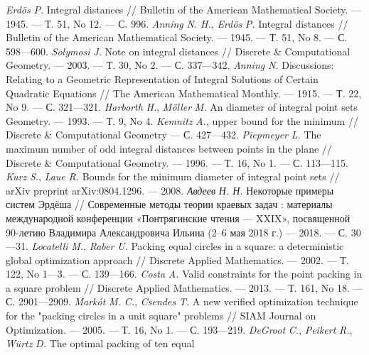 \begin{thebibliography}{99}
\textsl{Erdös} \textsl{P.} Integral distances /\!/ Bulletin of the
American Mathematical Society. — 1945. — Т. 51, No 12. — С. 996.
\textsl{Anning} \textsl{N. H.}, \textsl{Erdös} \textsl{P.}
Integral distances /\!/ Bulletin of the American Mathematical
Society. — 1945. — Т. 51, No 8. — С. 598—600.
\textsl{Solymosi} \textsl{J.} Note on integral distances /\!/
Discrete \& Computational Geometry. — 2003. — Т. 30, No 2. —
С. 337—342.
\textsl{Anning} \textsl{N.} Discussions: Relating to a Geometric
Representation of Integral Solutions of Certain Quadratic
Equations /\!/ The American Mathematical Monthly. — 1915. —
Т. 22, No 9. — С. 321—321.
\textsl{Harborth} \textsl{H.},
\textsl{Möller} \textsl{M.} An
diameter of integral point sets
Geometry. — 1993. — Т. 9, No 4.
\textsl{Kemnitz} \textsl{A.},
upper bound for the minimum
/\!/ Discrete \& Computational Geometry
— С. 427—432.
\textsl{Piepmeyer} \textsl{L.} The maximum number of odd
integral distances between points in the plane /\!/ Discrete \&
Computational Geometry. — 1996. — Т. 16, No 1. — С. 113—115.
\textsl{Kurz} \textsl{S.}, \textsl{Laue} \textsl{R.} Bounds for
the minimum diameter of integral point sets /\!/ arXiv preprint
arXiv:0804.1296. — 2008.
\textsl{Авдеев} \textsl{Н. Н.} Некоторые примеры систем
Эрдёша /\!/ Современные методы теории краевых задач :
материалы международной конференции «Понтрягинские
чтения — XXIX», посвященной 90-летию Владимира
Александровича Ильина (2–6 мая 2018 г.) — 2018. — С. 30—31.
\textsl{Locatelli} \textsl{M.}, \textsl{Raber} \textsl{U.} Packing
equal circles in a square: a deterministic global optimization
approach /\!/ Discrete Applied Mathematics. — 2002. — Т. 122,
No 1—3. — С. 139—166.
\textsl{Costa} \textsl{A.} Valid constraints for the point packing
in a square problem /\!/ Discrete Applied Mathematics. — 2013. —
Т. 161, No 18. — С. 2901—2909.
\textsl{Markót} \textsl{M. C.}, \textsl{Csendes} \textsl{T.} A
new verified optimization technique for the "packing circles in
a unit square" problems /\!/ SIAM Journal on Optimization. —
2005. — Т. 16, No 1. — С. 193—219.
\textsl{DeGroot} \textsl{C.}, \textsl{Peikert} \textsl{R.},
\textsl{Würtz} \textsl{D.} The optimal packing of ten equal

\end{thebibliography}
